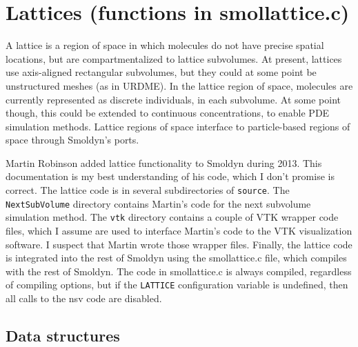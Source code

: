 \documentclass {scrbook}
\newcommand {\ttt} {\texttt}
\begin{document}
\section{Lattices (functions in smollattice.c)}

A lattice is a region of space in which molecules do not have precise spatial locations, but are compartmentalized to lattice subvolumes. At present, lattices use axis-aligned rectangular subvolumes, but they could at some point be unstructured meshes (as in URDME). In the lattice region of space, molecules are currently represented as discrete individuals, in each subvolume. At some point though, this could be extended to continuous concentrations, to enable PDE simulation methods. Lattice regions of space interface to particle-based regions of space through Smoldyn's ports.

Martin Robinson added lattice functionality to Smoldyn during 2013. This documentation is my best understanding of his code, which I don't promise is correct. The lattice code is in several subdirectories of \ttt{source}. The \ttt{NextSubVolume} directory contains Martin's code for the next subvolume simulation method. The \ttt{vtk} directory contains a couple of VTK wrapper code files, which I assume are used to interface Martin's code to the VTK visualization software. I suspect that Martin wrote those wrapper files. Finally, the lattice code is integrated into the rest of Smoldyn using the smollattice.c file, which compiles with the rest of Smoldyn. The code in smollattice.c is always compiled, regardless of compiling options, but if the \ttt{LATTICE} configuration variable is undefined, then all calls to the nsv code are disabled.

\subsection{Data structures}
\end{document}

